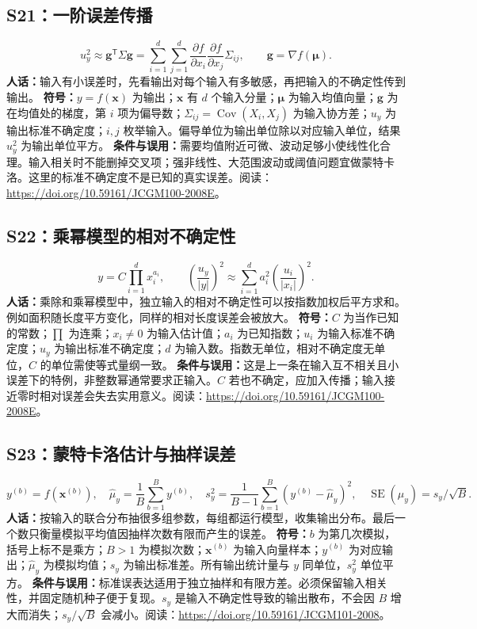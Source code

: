 \subsection{S21：一阶误差传播}
\begin{equation}
 u_y^2\approx\mathbf g^{\mathsf T}\Sigma\mathbf g
 =\sum_{i=1}^{d}\sum_{j=1}^{d}
 \frac{\partial f}{\partial x_i}\frac{\partial f}{\partial x_j}\Sigma_{ij},\qquad
 \mathbf g=\nabla f(\boldsymbol\mu).
\end{equation}
\textbf{人话：}输入有小误差时，先看输出对每个输入有多敏感，再把输入的不确定性传到输出。
\textbf{符号：}$y=f(\mathbf x)$ 为输出；$\mathbf x$ 有 $d$ 个输入分量；$\boldsymbol\mu$ 为输入均值向量；$\mathbf g$ 为在均值处的梯度，第 $i$ 项为偏导数；$\Sigma_{ij}=\operatorname{Cov}(X_i,X_j)$ 为输入协方差；$u_y$ 为输出标准不确定度；$i,j$ 枚举输入。偏导单位为输出单位除以对应输入单位，结果 $u_y^2$ 为输出单位平方。
\textbf{条件与误用：}需要均值附近可微、波动足够小使线性化合理。输入相关时不能删掉交叉项；强非线性、大范围波动或阈值问题宜做蒙特卡洛。这里的标准不确定度不是已知的真实误差。阅读：\url{https://doi.org/10.59161/JCGM100-2008E}。

\subsection{S22：乘幂模型的相对不确定性}
\begin{equation}
 y=C\prod_{i=1}^{d}x_i^{a_i},\qquad
 \left(\frac{u_y}{|y|}\right)^2\approx
 \sum_{i=1}^{d}a_i^2\left(\frac{u_i}{|x_i|}\right)^2.
\end{equation}
\textbf{人话：}乘除和乘幂模型中，独立输入的相对不确定性可以按指数加权后平方求和。例如面积随长度平方变化，同样的相对长度误差会被放大。
\textbf{符号：}$C$ 为当作已知的常数；$\prod$ 为连乘；$x_i\ne0$ 为输入估计值；$a_i$ 为已知指数；$u_i$ 为输入标准不确定度；$u_y$ 为输出标准不确定度；$d$ 为输入数。指数无单位，相对不确定度无单位，$C$ 的单位需使等式量纲一致。
\textbf{条件与误用：}这是上一条在输入互不相关且小误差下的特例，非整数幂通常要求正输入。$C$ 若也不确定，应加入传播；输入接近零时相对误差会失去实用意义。阅读：\url{https://doi.org/10.59161/JCGM100-2008E}。

\subsection{S23：蒙特卡洛估计与抽样误差}
\begin{equation}
 y^{(b)}=f(\mathbf x^{(b)}),\quad
 \hat\mu_y=\frac1B\sum_{b=1}^{B}y^{(b)},\quad
 s_y^2=\frac1{B-1}\sum_{b=1}^{B}(y^{(b)}-\hat\mu_y)^2,\quad
 \widehat{\operatorname{SE}}(\hat\mu_y)=s_y/\sqrt B.
\end{equation}
\textbf{人话：}按输入的联合分布抽很多组参数，每组都运行模型，收集输出分布。最后一个数只衡量模拟平均值因抽样次数有限而产生的误差。
\textbf{符号：}$b$ 为第几次模拟，括号上标不是乘方；$B>1$ 为模拟次数；$\mathbf x^{(b)}$ 为输入向量样本；$y^{(b)}$ 为对应输出；$\hat\mu_y$ 为模拟均值；$s_y$ 为输出标准差。所有输出统计量与 $y$ 同单位，$s_y^2$ 单位平方。
\textbf{条件与误用：}标准误表达适用于独立抽样和有限方差。必须保留输入相关性，并固定随机种子便于复现。$s_y$ 是输入不确定性导致的输出散布，不会因 $B$ 增大而消失；$s_y/\sqrt B$ 会减小。阅读：\url{https://doi.org/10.59161/JCGM101-2008}。

